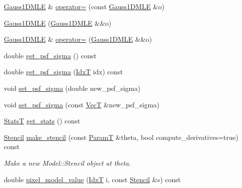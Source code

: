 \begin{DoxyCompactItemize}
\item 
\hyperlink{classmappel_1_1Gauss1DMLE}{Gauss1\+D\+M\+LE} \& \hyperlink{classmappel_1_1Gauss1DMLE_abdf5e62ce76f3df65b1aab2033a06841}{operator=} (const \hyperlink{classmappel_1_1Gauss1DMLE}{Gauss1\+D\+M\+LE} \&o)
\item 
\hyperlink{classmappel_1_1Gauss1DMLE_ae34c323a2ed446809e12c7048668de8f}{Gauss1\+D\+M\+LE} (\hyperlink{classmappel_1_1Gauss1DMLE}{Gauss1\+D\+M\+LE} \&\&o)
\item 
\hyperlink{classmappel_1_1Gauss1DMLE}{Gauss1\+D\+M\+LE} \& \hyperlink{classmappel_1_1Gauss1DMLE_ac12500176f211a6331c18470c009de81}{operator=} (\hyperlink{classmappel_1_1Gauss1DMLE}{Gauss1\+D\+M\+LE} \&\&o)
\item 
double \hyperlink{classmappel_1_1Gauss1DModel_a8786ff874e58de054ab3633a5f201192}{get\+\_\+psf\+\_\+sigma} () const 
\item 
double \hyperlink{classmappel_1_1Gauss1DModel_ae7bd64fb97894f9657be0a4b542aa3c6}{get\+\_\+psf\+\_\+sigma} (\hyperlink{namespacemappel_ab17ec0f30b61ece292439d7ece81d3a8}{IdxT} idx) const 
\item 
void \hyperlink{classmappel_1_1Gauss1DModel_a5c09d4cf98de58fb67d881b560e6a3e8}{set\+\_\+psf\+\_\+sigma} (double new\+\_\+psf\+\_\+sigma)
\item 
void \hyperlink{classmappel_1_1Gauss1DModel_accb0aad54534660e5acd2d6fc01268f1}{set\+\_\+psf\+\_\+sigma} (const \hyperlink{namespacemappel_a2225ad69f358daa3f4f99282a35b9a3a}{VecT} \&new\+\_\+psf\+\_\+sigma)
\item 
\hyperlink{namespacemappel_a04ab395b0cf82c4ce68a36b2212649a5}{StatsT} \hyperlink{classmappel_1_1Gauss1DModel_a61904b6e14e7429ee58175cb54259ed9}{get\+\_\+stats} () const 
\item 
\hyperlink{classmappel_1_1Gauss1DModel_1_1Stencil}{Stencil} \hyperlink{classmappel_1_1Gauss1DModel_a3068438846f29467b2df5a8504151c20}{make\+\_\+stencil} (const \hyperlink{classmappel_1_1PointEmitterModel_a665ec6aea3aac139bb69a23c06d4b9a1}{ParamT} \&theta, bool compute\+\_\+derivatives=true) const 
\begin{DoxyCompactList}\small\item\em Make a new Model\+::\+Stencil object at theta. \end{DoxyCompactList}\item 
double \hyperlink{classmappel_1_1Gauss1DModel_af26feda273232841ae28b85b0dbab439}{pixel\+\_\+model\+\_\+value} (\hyperlink{namespacemappel_ab17ec0f30b61ece292439d7ece81d3a8}{IdxT} i, const \hyperlink{classmappel_1_1Gauss1DModel_1_1Stencil}{Stencil} \&s) const 

\end{DoxyCompactItemize}
